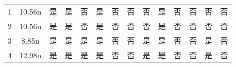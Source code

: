 \documentclass[withoutpreface,bwprint]{cumcmthesis} %
\begin{document}
\begin{table}[htbp]
{\begin{tabular}{c|c|cccc|cccc|cccc}
		1                   & 10.56n                 & 是                                                 & 是                                                 & 否                                               & 是                                                 & 否                                                 & 否                                                 & 否                                               & 是                                                 & 否                                                 & 否                                                 & 否                                               & 否                                                 \\
		2                   & 10.56n                 & 是                                                 & 是                                                 & 否                                               & 是                                                 & 否                                                 & 否                                                 & 否                                               & 是                                                 & 否                                                 & 否                                                 & 否                                               & 否                                                 \\
		3                   & 8.85n                  & 是                                                 & 是                                                 & 是                                               & 是                                                 & 否                                                 & 否                                                 & 是                                               & 是                                                 & 否                                                 & 否                                                 & 是                                               & 否                                                 \\
		4                   & 12.98n                 & 是                                                 & 是                                                 & 是                                               & 是                                                 & 否                                                 & 否                                                 & 是                                               & 是                                                 & 否                                                 & 否                                                 & 是                                               & 否                                                 \\

\end{tabular}}
\end{table}
\end{document}
